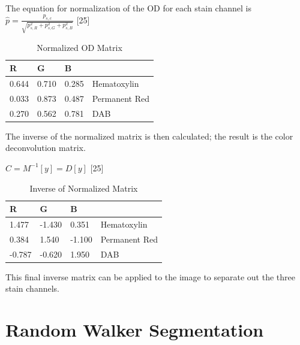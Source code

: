 \documentclass[12pt]{article}
\begin{document}
\noindent The equation for normalization of the OD for each stain channel is \begin{math}\hat{p} = \frac{p_{s,c}}{\sqrt{p_{s,R}^2 + p_{s,G}^2 + p_{s,B}^2}}\end{math} [25]


\begin{table}[H]
\centering
\caption{Normalized OD Matrix}
\label{Normalized OD}
\begin{tabular}{|l|l|l|l}
\cline{1-3}
R   & G   & B   &                                    \\ \hline
0.644 & 0.710 & 0.285 & \multicolumn{1}{l|}{Hematoxylin}   \\ \hline
0.033 & 0.873  & 0.487  & \multicolumn{1}{l|}{Permanent Red} \\ \hline
0.270 & 0.562 & 0.781 & \multicolumn{1}{l|}{DAB}           \\ \hline
\end{tabular}
\end{table}

\noindent The inverse of the normalized matrix is then calculated; the result is the color deconvolution matrix.

\begin{math}C = M^{-1}[y] = D[y]\end{math} [25]


\begin{table}[H]
\centering
\caption{Inverse of Normalized Matrix}
\label{Inverse Normalized}
\begin{tabular}{|l|l|l|l}
\cline{1-3}
R   & G   & B   &                                    \\ \hline
1.477 & -1.430 & 0.351 & \multicolumn{1}{l|}{Hematoxylin}   \\ \hline
0.384 & 1.540  & -1.100  & \multicolumn{1}{l|}{Permanent Red} \\ \hline
-0.787 & -0.620 & 1.950 & \multicolumn{1}{l|}{DAB}           \\ \hline
\end{tabular}
\end{table}

\noindent This final inverse matrix can be applied to the image to separate out the three stain channels.

\section*{Random Walker Segmentation}
\end{document}
